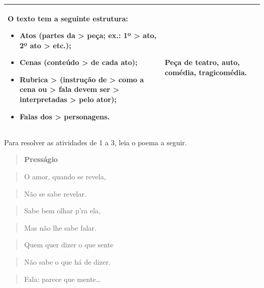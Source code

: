 \begin{longtable}[]{@{}lll@{}}
\begin{minipage}[t]{0.29\columnwidth}
O texto tem a seguinte estrutura:

\begin{itemize}
\item
  Atos (partes da \textgreater{} peça; ex.: 1º \textgreater{} ato, 2º
  ato \textgreater{} etc.);
\item
  Cenas (conteúdo \textgreater{} de cada ato);
\item
  Rubrica \textgreater{} (instrução de \textgreater{} como a cena ou
  \textgreater{} fala devem ser \textgreater{} interpretadas
  \textgreater{} pelo ator);
\item
  Falas dos \textgreater{} personagens.
\end{itemize}\strut
\end{minipage} & \begin{minipage}[t]{0.29\columnwidth}\raggedright
Peça de teatro, auto, comédia, tragicomédia.\strut
\end{minipage}\tabularnewline
\bottomrule
\end{longtable}


Para resolver as atividades de 1 a 3, leia o poema a seguir.

\begin{quote}
\textbf{Presságio}
\end{quote}

\begin{quote}
O amor, quando se revela,
\end{quote}

\begin{quote}
Não se sabe revelar.
\end{quote}

\begin{quote}
Sabe bem olhar p'ra ela,
\end{quote}

\begin{quote}
Mas não lhe sabe falar.
\end{quote}

\begin{quote}
Quem quer dizer o que sente
\end{quote}

\begin{quote}
Não sabe o que há de dizer.
\end{quote}

\begin{quote}
Fala: parece que mente\ldots{}
\end{quote}

